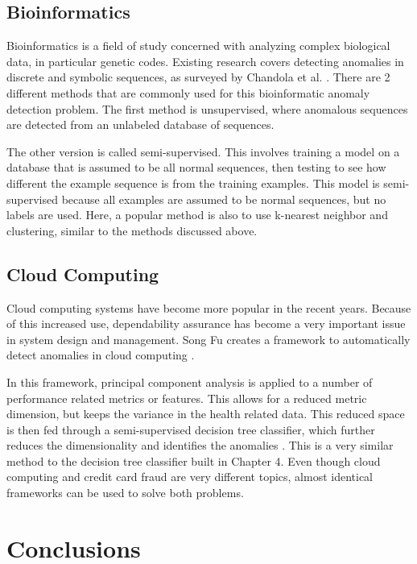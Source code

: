\documentclass[midd]{thesis}
\begin{document}
\section{Bioinformatics}

Bioinformatics is a field of study concerned with analyzing complex biological data, in particular genetic codes. Existing research covers detecting anomalies in discrete and symbolic sequences, as surveyed by Chandola et al. \cite{Chandola2012}. There are 2 different methods that are commonly used for this bioinformatic anomaly detection problem. The first method is unsupervised, where anomalous sequences are detected from an unlabeled database of sequences. 

The other version is called semi-supervised. This involves training a model on a database that is assumed to be all normal sequences, then testing to see how different the example sequence is from the training examples. This model is semi-supervised because all examples are assumed to be normal sequences, but no labels are used. Here, a popular method is also to use k-nearest neighbor and clustering, similar to the methods discussed above. 


\section{Cloud Computing}

Cloud computing systems have become more popular in the recent years. Because of this increased use, dependability assurance has become a very important issue in system design and management. Song Fu creates a framework to automatically detect anomalies in cloud computing  \cite{SongFu2011}. 

In this framework, principal component analysis is applied to a number of performance related metrics or features. This allows for a reduced metric dimension, but keeps the variance in the health related data. This reduced space is then fed through a semi-supervised decision tree classifier, which further reduces the dimensionality and identifies the anomalies \cite{SongFu2011}. This is a very similar method to the decision tree classifier built in Chapter 4. Even though cloud computing and credit card fraud are very different topics, almost identical frameworks can be used to solve both problems.


\pagebreak
\chapter{Conclusions}
\label{sec:conclusion}
\end{document}

